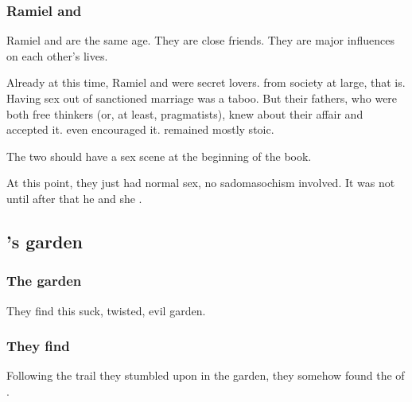 \subsubsection{Ramiel and \Shiaraid}
Ramiel and \Shiaraid{} are the same age. 
They are close friends. 
They are major influences on each other's lives. 

Already at this time, Ramiel and \Shiaraid{} were secret lovers. 
 from society at large, that is. 
Having sex out of sanctioned marriage was a taboo. 
But their fathers, who were both free thinkers (or, at least, pragmatists), knew about their affair and accepted it. 
\Zachirah{} even encouraged it.
\Nathrach{} remained mostly stoic. 

The two should have a  sex scene at the beginning of the book. 

At this point, they just had normal sex, no sadomasochism involved. 
It was not until after \Semiza{} that he  and she . 









\subsection[Semiza's garden]{\Semiza's garden}
\subsubsection{The garden}
They find this suck, twisted, evil garden. 






\subsubsection{They find \Semiza}
Following the trail they stumbled upon in the garden, they somehow found the  of . 


